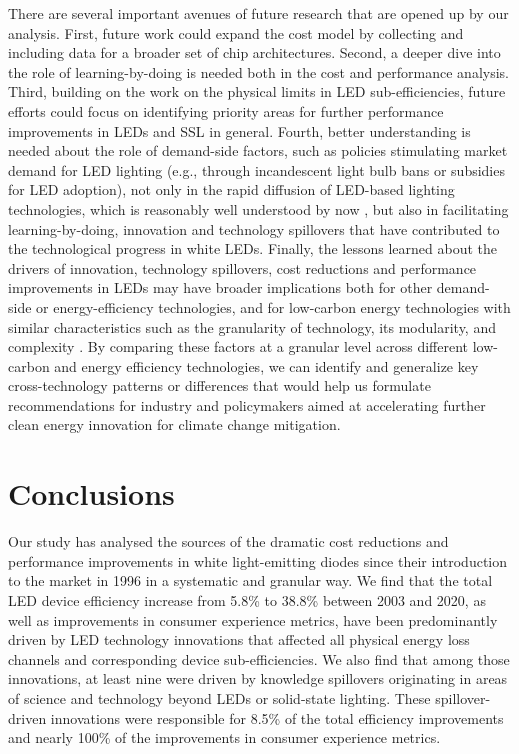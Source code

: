 \documentclass[parskip=full]{article}
\begin{document}
There are several important avenues of future research that are opened up by our analysis. First, future work could expand the cost model by collecting and including data for a broader set of chip architectures. Second, a deeper dive into the role of learning-by-doing is needed both in the cost and performance analysis. Third, building on the work on the physical limits in LED sub-efficiencies, future efforts could focus on identifying priority areas for further performance improvements in LEDs and SSL in general. Fourth, better understanding is needed about the role of demand-side factors, such as policies stimulating market demand for LED lighting (e.g., through incandescent light bulb bans or subsidies for LED adoption), not only in the rapid diffusion of LED-based lighting technologies, which is reasonably well understood by now \cite{Mills2014, Kamat2020, weinold2021quantifying, stegmaier2021incandescent, grubb2021new}, but also in facilitating learning-by-doing, innovation and technology spillovers that have contributed to the technological progress in white LEDs. Finally, the lessons learned about the drivers of innovation, technology spillovers, cost reductions and performance improvements in LEDs may have broader implications both for other demand-side or energy-efficiency technologies, and for low-carbon energy technologies with similar characteristics such as the granularity of technology, its modularity, and complexity \cite{malhotra2020accelerating, Wilson2012}. By comparing these factors at a granular level across different low-carbon and energy efficiency technologies, we can identify and generalize key cross-technology patterns or differences that would help us formulate recommendations for industry and policymakers aimed at accelerating further clean energy innovation for climate change mitigation.

\section{Conclusions}

Our study has analysed the sources of the dramatic cost reductions and performance improvements in white light-emitting diodes since their introduction to the market in 1996 in a systematic and granular way. We find that the total LED device efficiency increase from 5.8\% to 38.8\% between 2003 and 2020, as well as improvements in consumer experience metrics, have been predominantly driven by LED technology innovations that affected all physical energy loss channels and corresponding device sub-efficiencies. We also find that among those innovations, at least nine were driven by knowledge spillovers originating in areas of science and technology beyond LEDs or solid-state lighting. These spillover-driven innovations were responsible for 8.5\% of the total efficiency improvements and nearly 100\% of the improvements in consumer experience metrics. 
\end{document}
